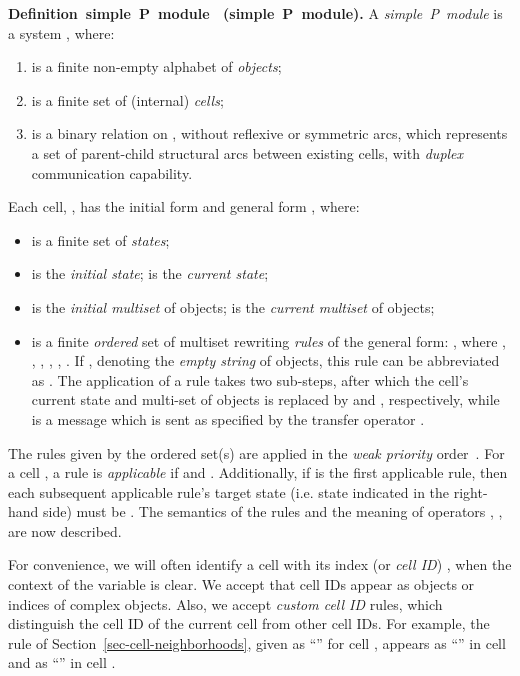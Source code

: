 \documentclass[preliminary,copyright,creativecommons]{eptcs}
\newenvironment{definition}[1][]
   {\refstepcounter{theorem} \par\medskip\noindent
   {\bf Definition~\thetheorem \ifx #1 \else ~(#1)\fi.} 
\ignorespaces }
   {\par\medskip }
\theoremstyle{remark}
\begin{document}
\begin{definition}[simple~P~module]
\label{def:simple-P-module}
A \emph{simple~P~module} is a system , where:
\begin{enumerate}
  \item  is a finite non-empty alphabet of \emph{objects};
  \item  is a finite set of (internal) \emph{cells};
  \item  is a binary relation on ,
      without reflexive or symmetric arcs,
	   which represents a set of parent-child structural arcs between existing cells, 
	   with \emph{duplex} communication capability.
\end{enumerate}

Each cell, , 
has the initial form  and 
general form , where:  
\begin{itemize}
  \item  is a finite set of \emph{states};
  \item  is the \emph{initial state};  is the \emph{current
state};
  \item  is the \emph{initial multiset} of objects;
    is the \emph{current multiset} of objects;
  \item  is a finite \emph{ordered} set of multiset rewriting \emph{rules} of the general form: 
        , 
        where , , 
        , 
        ,
        ,
        .
        If , denoting the \emph{empty string} of objects, this rule can be 
abbreviated as . The application of a rule takes two sub-steps, 
after which the cell's current state  and multi-set of objects  is replaced by  and ,
respectively, while  is a message which is sent as specified by the 
transfer operator .
\end{itemize}

The rules given by the ordered set(s)  are applied in the \emph{weak priority} order~\cite{Paun2006}.
For a cell , a rule 
is \emph{applicable} if  and .
Additionally, if  is the first applicable rule,
then each subsequent applicable rule's target state 
(i.e. state indicated in the right-hand side) must be .
The semantics of the rules and the meaning of operators ,
,  are now described.
\end{definition}

For convenience, we will often identify a cell  with its index (or
\emph{cell ID}) , when the context of the variable  is clear.
We accept that cell IDs appear as objects or indices of complex objects.
Also, we accept \emph{custom cell ID} rules, which distinguish the cell ID of
the current cell from other cell IDs.
For example, the rule  of Section~\ref{sec-cell-neighborhoods}, 
given as ``'' for cell ,
appears as ``'' in cell  
and as ``'' in cell .
\end{document}
